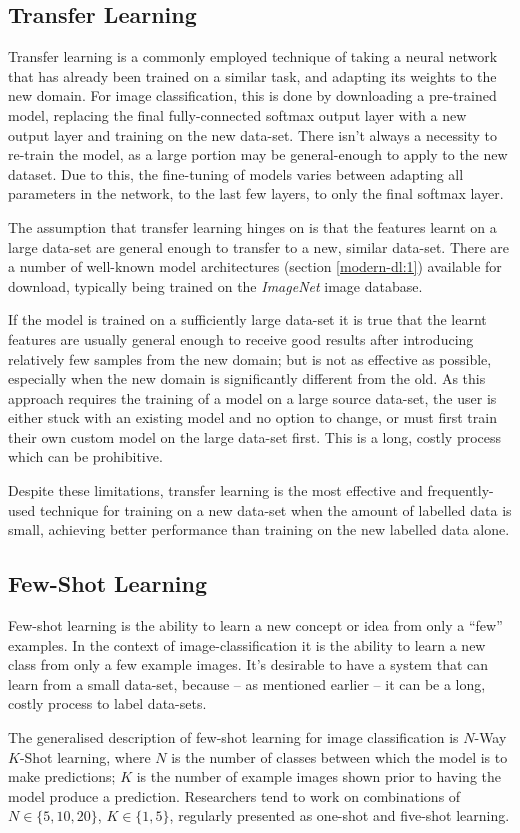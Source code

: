 \documentclass{report}
\begin{document}
	\subsection{Transfer Learning}
	Transfer learning is a commonly employed technique of taking a neural network that has already been trained on a similar task, and adapting its weights to the new domain. For image classification, this is done by downloading a pre-trained model, replacing the final fully-connected softmax output layer with a new output layer and training on the new data-set. There isn't always a necessity to re-train the model, as a large portion may be general-enough to apply to the new dataset. Due to this, the fine-tuning of models varies between adapting all parameters in the network, to the last few layers, to only the final softmax layer.  \par
	The assumption that transfer learning hinges on is that the features learnt on a large data-set are general enough to transfer to a new, similar data-set. There are a number of well-known model architectures (section \ref{modern-dl:1}) available for download, typically being trained on the \textit{ImageNet} image database. \par
	If the model is trained on a sufficiently large data-set it is true that the learnt features are usually general enough to receive good results after introducing relatively few samples from the new domain; but is not as effective as possible, especially when the new domain is significantly different from the old. As this approach requires the training of a model on a large source data-set, the user is either stuck with an existing model and no option to change, or must first train their own custom model on the large data-set first. This is a long, costly process which can be prohibitive. \par
	Despite these limitations, transfer learning is the most effective and frequently-used technique for training on a new data-set when the amount of labelled data is small, achieving better performance than training on the new labelled data alone. \par 

	\subsection{Few-Shot Learning}
	Few-shot learning is the ability to learn a new concept or idea from only a ``few'' examples. In the context of image-classification it is the ability to learn a new class from only a few example images. It's desirable to have a system that can learn from a small data-set, because -- as mentioned earlier -- it can be a long, costly process to label data-sets. \par
	The generalised description of few-shot learning for image classification is $N$-Way $K$-Shot learning, where $N$ is the number of classes between which the model is to make predictions; $K$ is the number of example images shown prior to having the model produce a prediction. Researchers tend to work on combinations of $N \in \{5, 10, 20\}$, $K \in \{1, 5\}$, regularly presented as one-shot and five-shot learning.
	
\end{document}
